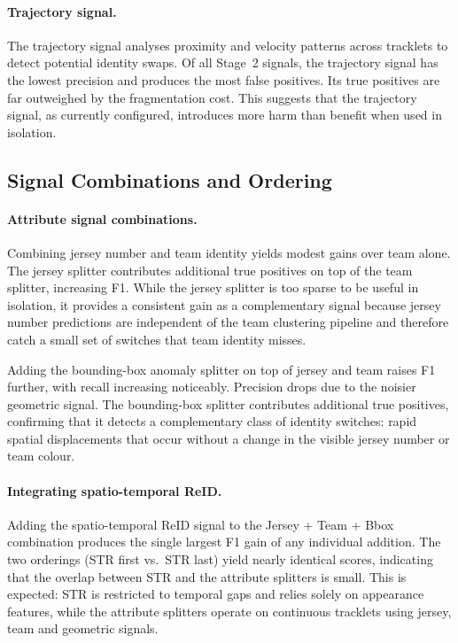 \paragraph{Trajectory signal.}
The trajectory signal analyses proximity and velocity patterns across tracklets to detect potential identity swaps. Of all Stage~2 signals, the trajectory signal has the lowest precision and produces the most false positives. Its true positives are far outweighed by the fragmentation cost. This suggests that the trajectory signal, as currently configured, introduces more harm than benefit when used in isolation.

\subsection{Signal Combinations and Ordering}\label{subsec:signal_combinations}

\paragraph{Attribute signal combinations.}
Combining jersey number and team identity yields modest gains over team alone. The jersey splitter contributes additional true positives on top of the team splitter, increasing F1. While the jersey splitter is too sparse to be useful in isolation, it provides a consistent gain as a complementary signal because jersey number predictions are independent of the team clustering pipeline and therefore catch a small set of switches that team identity misses.

Adding the bounding-box anomaly splitter on top of jersey and team raises F1 further, with recall increasing noticeably. Precision drops due to the noisier geometric signal. The bounding-box splitter contributes additional true positives, confirming that it detects a complementary class of identity switches: rapid spatial displacements that occur without a change in the visible jersey number or team colour.

\paragraph{Integrating spatio-temporal ReID.}
Adding the spatio-temporal ReID signal to the Jersey + Team + Bbox combination produces the single largest F1 gain of any individual addition. The two orderings (STR first vs.\ STR last) yield nearly identical scores, indicating that the overlap between STR and the attribute splitters is small. This is expected: STR is restricted to temporal gaps and relies solely on appearance features, while the attribute splitters operate on continuous tracklets using jersey, team and geometric signals.

